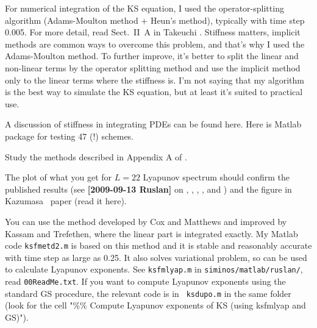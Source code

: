 \begin{description}
For numerical integration of the KS equation, I used the
operator-splitting algorithm (Adams-Moulton method + Heun's method),
typically with time step 0.005. For more detail, read Sect.~II~A in
Takeuchi \etal{}. Stiffness matters, implicit methods are
common ways to overcome this problem,
 and that's why I used the Adams-Moulton method. To further improve,
it's better to split the linear and non-linear terms
 by the operator splitting method and use the implicit method only to
 the linear terms where the stiffness is.
I'm not saying that my algorithm is the best way to simulate the KS
equation, but at least it's suited to practical use.

\item[2013-06-27 Predrag  to Xiong Ding]
A discussion of stiffness in integrating PDEs can be found
{here}.  {Here} is Matlab
package for testing 47 (!) schemes.

Study the methods described in
{Appendix A} of .

The plot of what you get for $L=22$
Lyapunov spectrum should confirm the published results (see
{\bf [2009-09-13 Ruslan]} on ,
, ,
, and ) and the
figure in Kazumasa \etal\
paper (read it
 {here}).

\item[2013-06-27 Ruslan]
You can use the method developed by Cox and
Matthews and improved by Kassam and
Trefethen, where the linear part is integrated exactly.
My Matlab code {\tt ksfmetd2.m} is based on this method and it is
stable and reasonably accurate with time step as large as 0.25.  It
also solves variational problem, so can be used to calculate Lyapunov
exponents.  See {\tt ksfmlyap.m} in {\tt siminos/matlab/ruslan/},
read {\tt 00ReadMe.txt}.  If you want to compute Lyapunov exponents
using the standard GS procedure, the relevant code is in {\tt
ksdupo.m} in the same folder (look for the cell "\%\% Compute
Lyapunov exponents of KS (using ksfmlyap and GS)").


\end{description}
